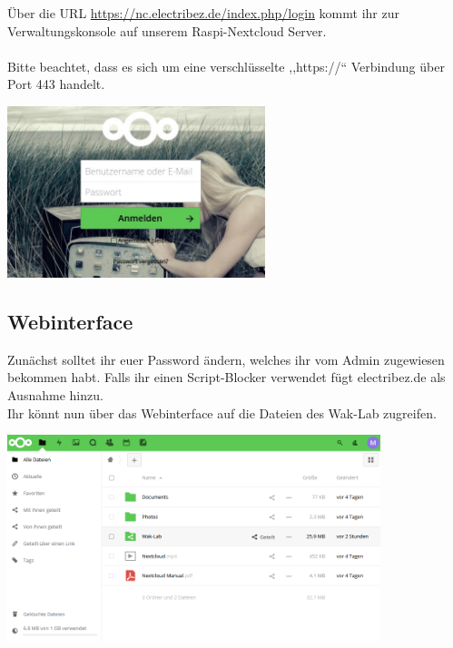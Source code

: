 Über die URL \url{https://nc.electribez.de/index.php/login} kommt ihr zur Verwaltungskonsole auf unserem Raspi-Nextcloud Server. \\
\ \\
Bitte beachtet, dass es sich um eine verschlüsselte ,,https://`` Verbindung über Port 443 handelt.\\

\begin{minipage}[t]{\textwidth}
  \centering
  \includegraphics[height=5cm]{pictures/Nextcloudlogin.jpg}
  \label{img:Nextcloudlogin}
\end{minipage}

\subsection{Webinterface}
Zunächst solltet ihr euer Password ändern, welches ihr vom Admin zugewiesen bekommen habt. Falls ihr einen Script-Blocker verwendet fügt electribez.de als Ausnahme hinzu.\\
Ihr könnt nun über das Webinterface auf die Dateien des Wak-Lab zugreifen.\\
 
\begin{minipage}[t]{\textwidth}
  \centering
  \includegraphics[height=6cm]{pictures/NextcloudWebinterface.png}
  \label{img:NextcloudWebinterface}
\end{minipage}


